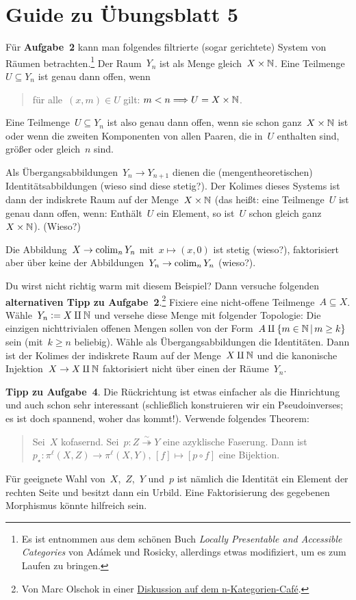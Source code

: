 \documentclass{uebblatt}
\begin{document}
\section*{Guide zu Übungsblatt 5}

Für \textbf{Aufgabe~2} kann man folgendes filtrierte (sogar gerichtete) System
von Räumen betrachten.\footnote{Es ist entnommen aus dem schönen Buch
\emph{Locally Presentable and Accessible Categories} von Adámek und Rosicky,
allerdings etwas modifiziert, um es zum Laufen zu bringen.}
Der Raum~$Y_n$ ist als Menge gleich~$X \times \mathbb{N}$. Eine
Teilmenge~$U \subseteq Y_n$ ist genau dann offen, wenn
\begin{quote}
für alle~$(x,m) \in U$ gilt: $m < n \Longrightarrow U = X \times \mathbb{N}$.
\end{quote}
Eine Teilmenge~$U \subseteq Y_n$ ist also genau dann offen, wenn sie schon
ganz~$X \times \mathbb{N}$ ist oder wenn die zweiten Komponenten von allen Paaren,
die in~$U$ enthalten sind, größer oder gleich~$n$ sind.

Als Übergangsabbildungen~$Y_n \to Y_{n+1}$ dienen die (mengentheoretischen)
Iden\-ti\-täts\-ab\-bil\-dun\-gen (wieso sind diese stetig?). Der Kolimes dieses Systems
ist dann der indiskrete Raum auf der Menge~$X \times \mathbb{N}$ (das heißt: eine
Teilmenge~$U$ ist genau dann offen, wenn: Enthält~$U$ ein Element, so ist~$U$
schon gleich ganz~$X \times \mathbb{N}$). (Wieso?)

Die Abbildung~$X \to \operatorname*{colim}_n Y_n$ mit~$x \mapsto (x,0)$ ist stetig (wieso?),
faktorisiert aber über keine der Abbildungen~$Y_n \to \operatorname*{colim}_n Y_n$ (wieso?).

Du wirst nicht richtig warm mit diesem Beispiel? Dann versuche folgenden
\textbf{alternativen Tipp zu Aufgabe~2}.\footnote{Von Marc Olschok in einer
\href{https://golem.ph.utexas.edu/category/2009/05/journal_club_geometric_infinit_3.html\#c023818}{Diskussion
auf dem n-Kategorien-Café}.}
Fixiere eine nicht-offene Teilmenge~$A \subseteq X$. Wähle~$Y_n \vcentcolon= X \amalg
\mathbb{N}$ und versehe diese Menge mit folgender Topologie: Die einzigen
nichttrivialen offenen Mengen sollen von der Form~$A \amalg \{ m \in \mathbb{N} \,|\,
m \geq k \}$ sein (mit~$k \geq n$ beliebig). Wähle als Übergangsabbildungen
die Identitäten. Dann ist der Kolimes der indiskrete Raum auf der Menge~$X
\amalg \mathbb{N}$ und die kanonische Injektion~$X \to X \amalg \mathbb{N}$ faktorisiert
nicht über einen der Räume~$Y_n$.

\textbf{Tipp zu Aufgabe~4}. Die Rückrichtung ist etwas einfacher als die
Hinrichtung und auch schon sehr interessant (schließlich konstruieren wir ein
Pseudoinverses; es ist doch spannend, woher das kommt!). Verwende folgendes
Theorem:
\begin{quote}Sei~$X$ kofasernd. Sei~$p : Z \stackrel{\sim}{\twoheadrightarrow} Y$
eine azyklische Faserung. Dann ist~$p_\star : \pi^\ell(X,Z) \to
\pi^\ell(X,Y),\,[f] \mapsto [p \circ f]$ eine Bijektion.
\end{quote}
Für geeignete Wahl von~$X$,~$Z$,~$Y$ und~$p$ ist nämlich die Identität ein
Element der rechten Seite und besitzt dann ein Urbild. Eine Faktorisierung des
gegebenen Morphismus könnte hilfreich sein.
\end{document}
